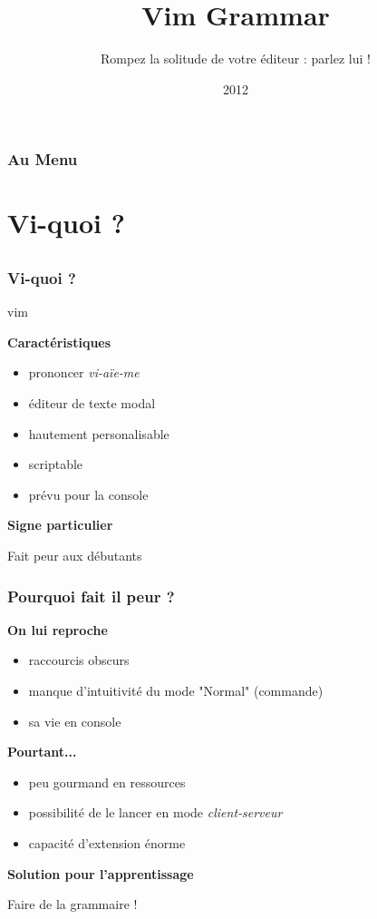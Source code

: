 \documentclass{beamer}
\title[Vim Grammar]{Vim Grammar}
\author{Rompez la solitude de votre éditeur : parlez lui !}
\institute{Mathieu (matael) Gaborit | HAUM}
\date{2012}
\begin{document}
\begin{frame}
\titlepage
\end{frame}

\begin{frame}
\frametitle{Au Menu}
\tableofcontents
\end{frame}

\section{Vi-quoi ?}
\subsection{}
\frame{\tableofcontents[currentsection]}

\begin{frame}
\frametitle{Vi-quoi ?}
\begin{center}
vim
\end{center}
\pause{}

{\bf  Caractéristiques} 
\begin{itemize}
    \item prononcer {\it vi-aïe-me}
    \item éditeur de texte modal
    \item hautement personalisable
    \item scriptable
    \item prévu pour la console
\end{itemize}

\pause{}
{\bf Signe particulier} 
\pause
\begin{center}
Fait peur aux débutants
\end{center}
\end{frame}

\begin{frame}
\frametitle{Pourquoi fait il peur ?}
{\bf On lui reproche}
\pause{}
\begin{itemize}
    \item raccourcis obscurs
    \item manque d'intuitivité du mode "Normal" (commande)
    \item sa vie en console
\end{itemize}

\pause{}

{\bf Pourtant...}
\pause{}
\begin{itemize}
    \item peu gourmand en ressources
    \item possibilité de le lancer en mode {\it client-serveur}
    \item capacité d'extension énorme
\end{itemize}

\pause{}
{\bf Solution pour l'apprentissage}
\pause{}
\begin{center}
Faire de la grammaire !
\end{center}

\end{frame}
\end{document}
